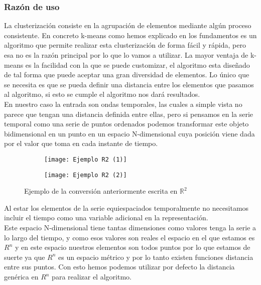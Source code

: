 \documentclass[12pt,a4paper]{article}
\begin{document}
			\subsubsection{Razón de uso}
			La clusterización consiste en la agrupación de elementos mediante algún proceso consistente. En concreto k-means como hemos explicado en los fundamentos es un algoritmo que permite realizar esta clusterización de forma fácil y rápida, pero esa no es la razón principal por lo que lo vamos a utilizar. La mayor ventaja de k-means es la facilidad con la que se puede customizar, el algoritmo esta diseñado de tal forma que puede aceptar una gran diversidad de elementos. Lo único que se necesita es que se pueda definir una distancia entre los elementos que pasamos al algoritmo, si esto se cumple el algoritmo nos dará resultados.\\
			En nuestro caso la entrada son ondas temporales, las cuales a simple vista no parece que tengan una distancia definida entre ellas, pero si pensamos en la serie temporal como una serie de puntos ordenados podemos transformar este objeto bidimensional en un punto en un espacio N-dimensional cuya posición viene dada por el valor que toma en cada instante de tiempo.\\
\begin{figure}[H]
\centering
\begin{subfigure}{.5\textwidth}
  \centering
  \texttt{[image: Ejemplo R2 (1)]}
  \label{fig:sub1}
\end{subfigure}%
\begin{subfigure}{.5\textwidth}
  \centering
  \texttt{[image: Ejemplo R2 (2)]}
  \label{fig:sub2}
\end{subfigure}
\caption{Ejemplo de la conversión anteriormente escrita en $\mathbb{R}^2$}
\label{fig:test}
\end{figure}
Al estar los elementos de la serie equiespaciados temporalmente no necesitamos incluir el tiempo como una variable adicional en la representación.\\
			Este espacio N-dimensional tiene tantas dimensiones como valores tenga la serie a lo largo del tiempo, y como esos valores son reales el espacio en el que estamos es $R^n$ y en este espacio nuestros elementos son todos puntos por lo que estamos de suerte ya que $R^n$ es un espacio métrico y por lo tanto existen funciones distancia entre sus puntos. Con esto hemos podemos utilizar por defecto la distancia genérica en $R^n$ para realizar el algoritmo.\\
			
\end{document}
